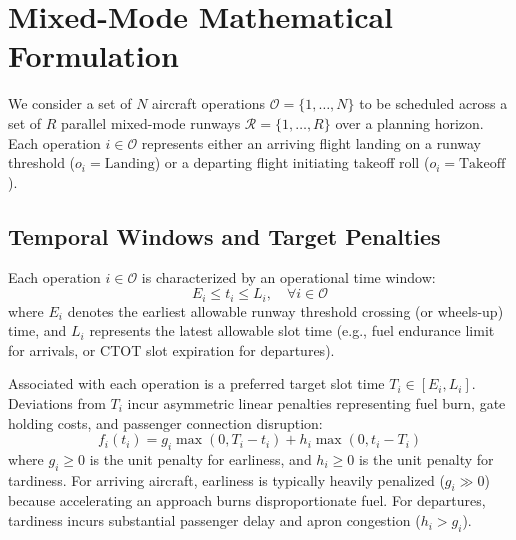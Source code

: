 \documentclass[10pt,journal,compsoc]{IEEEtran}
\begin{document}
\section{Mixed-Mode Mathematical Formulation}
\label{sec:formulation}

We consider a set of $N$ aircraft operations $\mathcal{O} = \{1, \dots, N\}$ to be scheduled across a set of $R$ parallel mixed-mode runways $\mathcal{R} = \{1, \dots, R\}$ over a planning horizon. Each operation $i \in \mathcal{O}$ represents either an arriving flight landing on a runway threshold ($o_i = \text{Landing}$) or a departing flight initiating takeoff roll ($o_i = \text{Takeoff}$).

\subsection{Temporal Windows and Target Penalties}
Each operation $i \in \mathcal{O}$ is characterized by an operational time window:
\begin{equation}
E_i \le t_i \le L_i, \quad \forall i \in \mathcal{O}
\label{eq:window_const}
\end{equation}
where $E_i$ denotes the earliest allowable runway threshold crossing (or wheels-up) time, and $L_i$ represents the latest allowable slot time (e.g., fuel endurance limit for arrivals, or CTOT slot expiration for departures).

Associated with each operation is a preferred target slot time $T_i \in [E_i, L_i]$. Deviations from $T_i$ incur asymmetric linear penalties representing fuel burn, gate holding costs, and passenger connection disruption:
\begin{equation}
f_i(t_i) = g_i \max(0, T_i - t_i) + h_i \max(0, t_i - T_i)
\label{eq:penalty_func}
\end{equation}
where $g_i \ge 0$ is the unit penalty for earliness, and $h_i \ge 0$ is the unit penalty for tardiness. For arriving aircraft, earliness is typically heavily penalized ($g_i \gg 0$) because accelerating an approach burns disproportionate fuel. For departures, tardiness incurs substantial passenger delay and apron congestion ($h_i > g_i$).
\end{document}
